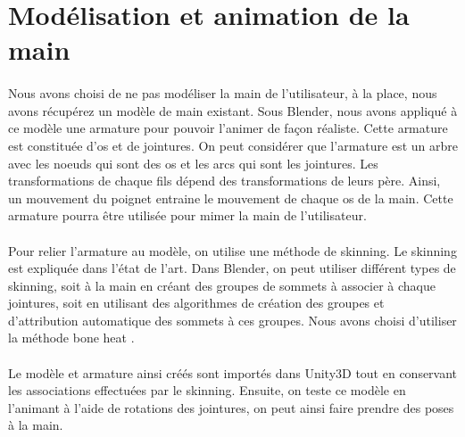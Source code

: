 \section{Modélisation et animation de la main}
\paragraph{}
Nous avons choisi de ne pas modéliser la main de l'utilisateur, à la place, nous avons récupérez un modèle de main existant.
Sous Blender, nous avons appliqué à ce modèle une armature pour pouvoir l'animer de façon réaliste. Cette armature est constituée d'os et de jointures. On peut considérer que l'armature est 
un arbre avec les noeuds qui sont des os et les arcs qui sont les jointures. Les transformations de chaque fils dépend des transformations de leurs père. Ainsi, un mouvement du poignet 
entraine le mouvement de chaque os de la main. Cette armature pourra être utilisée pour mimer la main de l'utilisateur. 

\paragraph{}
Pour relier l'armature au modèle, on utilise une méthode de skinning. Le skinning est expliquée dans l'état de l'art. Dans Blender, on peut utiliser différent types de skinning, 
soit \og à la main \fg en créant des groupes de sommets à associer à chaque jointures, soit en utilisant des algorithmes de création des groupes et d'attribution automatique des 
sommets à ces groupes. Nous avons choisi d'utiliser la méthode \og bone heat \fg. \cite{baran2007automatic}

\paragraph{}
Le modèle et armature ainsi créés sont importés dans Unity3D tout en conservant les associations effectuées par le skinning. Ensuite, on teste ce modèle en l'animant à l'aide de 
rotations des jointures, on peut ainsi faire prendre des poses à la main. 

